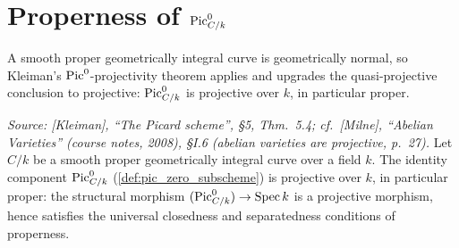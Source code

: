 \section{Properness of \(\operatorname{Pic}^0_{C/k}\)}
\label{sec:pic0_proper}

A smooth proper geometrically integral curve is geometrically normal,
so Kleiman's \(\operatorname{Pic}^0\)-projectivity theorem applies and upgrades the
quasi-projective conclusion to projective: \(\operatorname{Pic}^0_{C/k}\) is
projective over \(k\), in particular proper.

\begin{theorem}
  \label{thm:pic0_proper}

  \textit{Source: [Kleiman], ``The Picard scheme'', \S 5,
  Thm.~5.4; cf.\ [Milne], ``Abelian Varieties'' (course notes,
  2008), \S I.6 (abelian varieties are projective, p.~27).}
  Let \(C/k\) be a smooth proper geometrically integral curve over a
  field \(k\). The identity component \(\operatorname{Pic}^0_{C/k}\)
  (\cref{def:pic_zero_subscheme}) is projective over \(k\), in
  particular proper: the structural morphism
  \((\operatorname{Pic}^0_{C/k}) \to \operatorname{Spec} k\) is a projective morphism, hence
  satisfies the universal closedness and separatedness conditions of
  properness.
\end{theorem}


